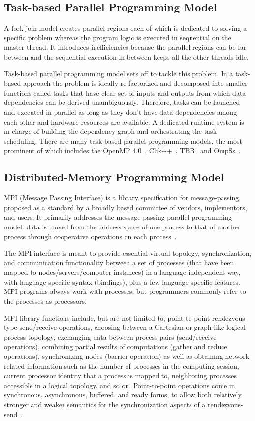 \subsection{Task-based Parallel Programming Model}
A fork-join model creates parallel regions each of which is dedicated to solving 
a specific problem whereas the program logic is executed in sequential on the 
master thread. It introduces inefficiencies because the parallel regions can be 
far between and the sequential execution in-between keeps all the other threads 
idle. 

Task-based parallel programming model sets off to tackle this problem. In a 
task-based approach the problem is ideally re-factorized and decomposed into 
smaller functions called tasks that have clear set of inputs and outputs from 
which data dependencies can be derived unambiguously. Therefore, tasks can be 
launched and executed in parallel as long as they don't have data dependencies 
among each other and hardware resources are available. A dedicated runtime 
system is in charge of building the dependency graph and orchestrating the task 
scheduling. There are many task-based parallel programming models, the most 
prominent of which includes the OpenMP 4.0~\cite{OpenMP4.0}, Clik++~\cite{clik},
TBB~\cite{tbb} and OmpSs~\cite{ompss}.

\subsection{Distributed-Memory Programming Model}
MPI (Message Passing Interface) is a library specification for message-passing, 
proposed as a standard by a broadly based committee of vendors, implementors, 
and users. It primarily addresses the message-passing parallel programming 
model: data is moved from the address space of one process to that of another 
process through cooperative operations on each process~\cite{llnl_mpi}.

The MPI interface is meant to provide essential virtual topology, 
synchronization, and communication functionality between a set of processes 
(that have been mapped to nodes/servers/computer instances) in a 
language-independent way, with language-specific syntax (bindings), plus a few 
language-specific features. MPI programs always work with processes, but 
programmers commonly refer to the processes as processors. 

MPI library functions include, but are not limited to, point-to-point 
rendezvous-type send/receive operations, choosing between a Cartesian or 
graph-like logical process topology, exchanging data between process pairs 
(send/receive operations), combining partial results of computations (gather and 
reduce operations), synchronizing nodes (barrier operation) as well as obtaining 
network-related information such as the number of processes in the computing 
session, current processor identity that a process is mapped to, neighboring 
processes accessible in a logical topology, and so on. Point-to-point operations 
come in synchronous, asynchronous, buffered, and ready forms, to allow both 
relatively stronger and weaker semantics for the synchronization aspects of a 
rendezvous-send~\cite{wiki_mpi}.

